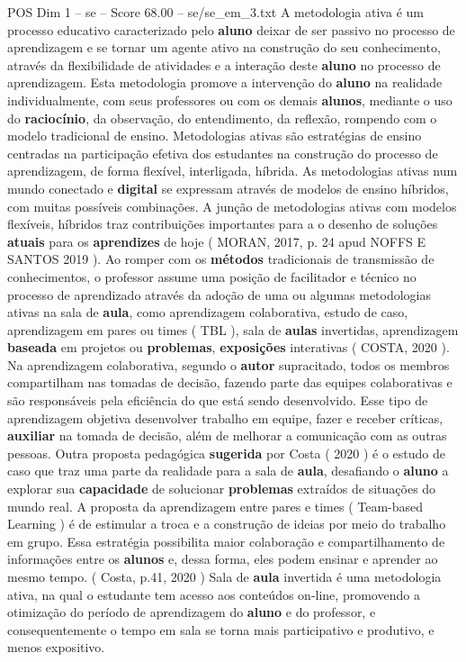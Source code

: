 \begin{textsample}{POS Dim 1 – se – Score 68.00 – se/se\_em\_3.txt}
A metodologia ativa é um processo educativo caracterizado pelo \textbf{aluno} deixar de ser passivo no processo de aprendizagem e se tornar um agente ativo na construção do seu conhecimento, através da flexibilidade de atividades e a interação deste \textbf{aluno} no processo de aprendizagem.
Esta metodologia promove a intervenção do \textbf{aluno} na realidade individualmente, com seus professores ou com os demais \textbf{alunos}, mediante o uso do \textbf{raciocínio}, da observação, do entendimento, da reflexão, rompendo com o modelo tradicional de ensino.
Metodologias ativas são estratégias de ensino centradas na participação efetiva dos estudantes na construção do processo de aprendizagem, de forma flexível, interligada, híbrida.
As metodologias ativas num mundo conectado e \textbf{digital} se expressam através de modelos de ensino híbridos, com muitas possíveis combinações.
A junção de metodologias ativas com modelos flexíveis, híbridos traz contribuições importantes para a o desenho de soluções \textbf{atuais} para os \textbf{aprendizes} de hoje ( MORAN, 2017, p. 24 apud NOFFS E SANTOS 2019 ).
Ao romper com os \textbf{métodos} tradicionais de transmissão de conhecimentos, o professor assume uma posição de facilitador e técnico no processo de aprendizado através da adoção de uma ou algumas metodologias ativas na sala de \textbf{aula}, como aprendizagem colaborativa, estudo de caso, aprendizagem em pares ou times ( TBL ), sala de \textbf{aulas} invertidas, aprendizagem \textbf{baseada} em projetos ou \textbf{problemas}, \textbf{exposições} interativas ( COSTA, 2020 ).
Na aprendizagem colaborativa, segundo o \textbf{autor} supracitado, todos os membros compartilham nas tomadas de decisão, fazendo parte das equipes colaborativas e são responsáveis pela eficiência do que está sendo desenvolvido.
Esse tipo de aprendizagem objetiva desenvolver trabalho em equipe, fazer e receber críticas, \textbf{auxiliar} na tomada de decisão, além de melhorar a comunicação com as outras pessoas.
Outra proposta pedagógica \textbf{sugerida} por Costa ( 2020 ) é o estudo de caso que traz uma parte da realidade para a sala de \textbf{aula}, desafiando o \textbf{aluno} a explorar sua \textbf{capacidade} de solucionar \textbf{problemas} extraídos de situações do mundo real.
A proposta da aprendizagem entre pares e times ( Team-based Learning ) é de estimular a troca e a construção de ideias por meio do trabalho em grupo.
Essa estratégia possibilita maior colaboração e compartilhamento de informações entre os \textbf{alunos} e, dessa forma, eles podem ensinar e aprender ao mesmo tempo. ( Costa, p.41, 2020 ) Sala de \textbf{aula} invertida é uma metodologia ativa, na qual o estudante tem acesso aos conteúdos on-line, promovendo a otimização do período de aprendizagem do \textbf{aluno} e do professor, e consequentemente o tempo em sala se torna mais participativo e produtivo, e menos expositivo.

\end{textsample}

